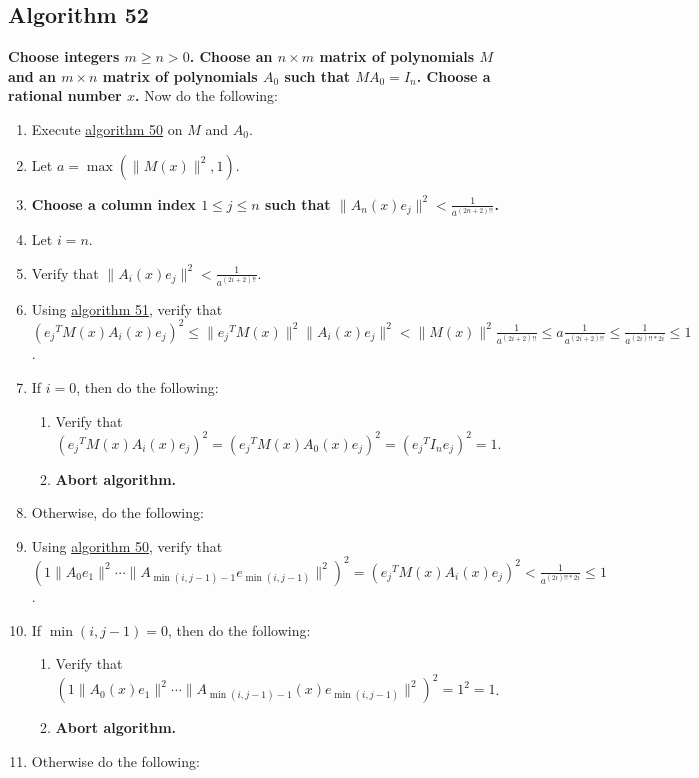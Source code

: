 \documentclass[twocolumn]{article}
\begin{document}
		\subsection{Algorithm 52}\label{sec:algorithm 52}
			\textbf{Choose integers $m\ge n>0$. Choose an $n\times m$ matrix of polynomials $M$ and an $m\times n$ matrix of polynomials $A_0$ such that $MA_0=I_n$. Choose a rational number $x$.} Now do the following:
			\begin{enumerate}
				\item Execute \hyperref[sec:algorithm 50]{algorithm 50} on $M$ and $A_0$.
				\item Let $a=\max(\lVert M(x)\rVert^2,1)$.
				\item \textbf{Choose a column index $1\le j\le n$ such that $\lVert A_n(x)e_j\rVert^2<\frac{1}{a^{(2n+2)!!}}$.}
				\item Let $i=n$.
				\item Verify that $\lVert A_i(x)e_j\rVert^2<\frac{1}{a^{(2i+2)!!}}$.
				\item Using \hyperref[sec:algorithm 51]{algorithm 51}, verify that $({e_j}^TM(x)A_i(x)e_j)^2\le\lVert{e_j}^TM(x)\rVert^2\lVert A_i(x)e_j\rVert^2<\lVert M(x)\rVert^2\frac{1}{a^{(2i+2)!!}}\le a\frac{1}{a^{(2i+2)!!}}\le\frac{1}{a^{(2i)!!*2i}}\le 1$.
				\item If $i=0$, then do the following:
				\begin{enumerate}
					\item Verify that $({e_j}^TM(x)A_i(x)e_j)^2=({e_j}^TM(x)A_0(x)e_j)^2=({e_j}^TI_ne_j)^2=1$.
					\item \textbf{Abort algorithm.}
				\end{enumerate}
				\item Otherwise, do the following:
				\item Using \hyperref[sec:algorithm 50]{algorithm 50}, verify that $(1\lVert A_0e_1\rVert^2\cdots\lVert A_{\min(i,j-1)-1}e_{\min(i,j-1)}\rVert^2)^2=({e_j}^TM(x)A_i(x)e_j)^2<\frac{1}{a^{(2i)!!*2i}}\le 1$.
				\item If $\min(i,j-1)=0$, then do the following:
				\begin{enumerate}
					\item Verify that $(1\lVert A_0(x)e_1\rVert^2\cdots\allowbreak\lVert A_{\min(i,j-1)-1}(x)e_{\min(i,j-1)}\rVert^2)^2=1^2=1$.
					\item \textbf{Abort algorithm.}
				\end{enumerate}
				\item Otherwise do the following:
				\begin{enumerate}

\end{enumerate}
\end{enumerate}
\end{document}
